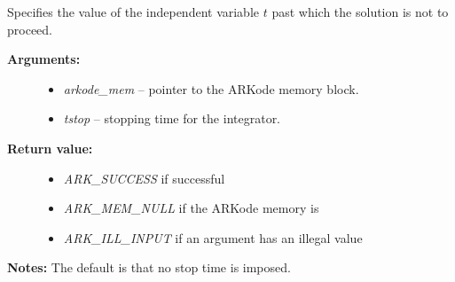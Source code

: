 \documentclass[letterpaper,10pt,english]{sphinxmanual}
\begin{document}
\begin{fulllineitems}
\label{c_interface/User_callable:c.ARKodeSetStopTime}
Specifies the value of the independent variable
\(t\) past which the solution is not to proceed.
\begin{description}
\item[{\textbf{Arguments:}}] \leavevmode\begin{itemize}
\item {} 
\emph{arkode\_mem} -- pointer to the ARKode memory block.

\item {} 
\emph{tstop} -- stopping time for the integrator.

\end{itemize}

\item[{\textbf{Return value:}}] \leavevmode\begin{itemize}
\item {} 
\emph{ARK\_SUCCESS} if successful

\item {} 
\emph{ARK\_MEM\_NULL} if the ARKode memory is 

\item {} 
\emph{ARK\_ILL\_INPUT} if an argument has an illegal value

\end{itemize}

\end{description}

\textbf{Notes:} The default is that no stop time is imposed.

\end{fulllineitems}

\end{document}
